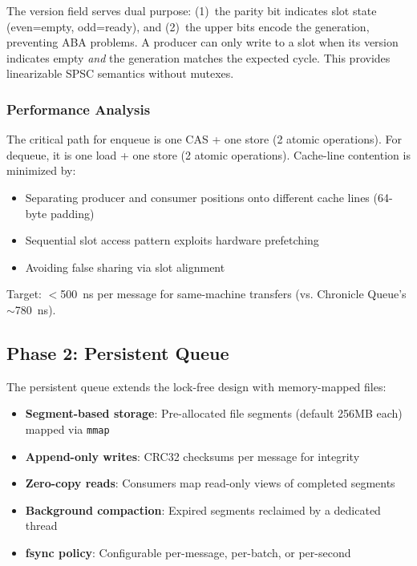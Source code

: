 \documentclass[11pt,a4paper,twocolumn]{article}
\begin{document}
The version field serves dual purpose: (1)~the parity bit indicates slot state (even=empty, odd=ready), and (2)~the upper bits encode the generation, preventing ABA problems. A producer can only write to a slot when its version indicates empty \textit{and} the generation matches the expected cycle. This provides linearizable SPSC semantics without mutexes.

\subsubsection{Performance Analysis}

The critical path for enqueue is one CAS + one store (2 atomic operations). For dequeue, it is one load + one store (2 atomic operations). Cache-line contention is minimized by:

\begin{itemize}[nosep]
\item Separating producer and consumer positions onto different cache lines (64-byte padding)
\item Sequential slot access pattern exploits hardware prefetching
\item Avoiding false sharing via slot alignment
\end{itemize}

Target: $<$500~ns per message for same-machine transfers (vs. Chronicle Queue's $\sim$780~ns).

\subsection{Phase 2: Persistent Queue}

The persistent queue extends the lock-free design with memory-mapped files:

\begin{itemize}[nosep]
\item \textbf{Segment-based storage}: Pre-allocated file segments (default 256MB each) mapped via \texttt{mmap}
\item \textbf{Append-only writes}: CRC32 checksums per message for integrity
\item \textbf{Zero-copy reads}: Consumers map read-only views of completed segments
\item \textbf{Background compaction}: Expired segments reclaimed by a dedicated thread
\item \textbf{fsync policy}: Configurable per-message, per-batch, or per-second
\end{itemize}
\end{document}
